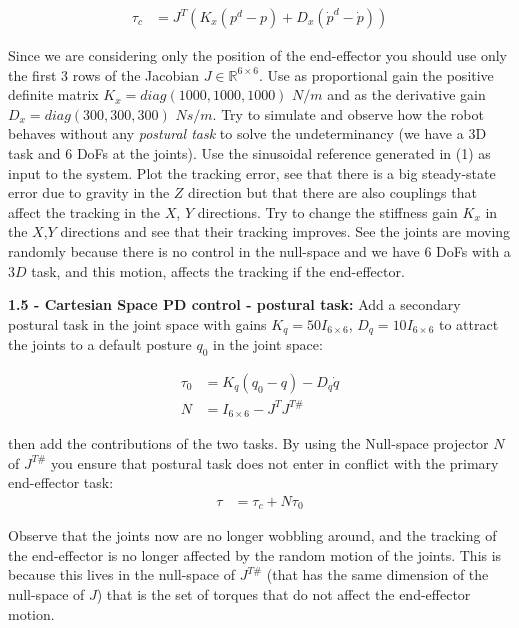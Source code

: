 \documentclass[11pt]{article}
\newcommand{\Rnum}{\mathbb{R}} %
\begin{document}
\begin{align}
\tau_c & = J^T\left(K_x(p^d - p) + D_x(\dot{p}^d -\dot{p})\right)
\end{align}

Since we are considering only the position of the end-effector you should use only the first 3 rows of the Jacobian $J \in \Rnum^{6 \times 6}$. 
Use  as proportional gain the positive definite matrix $K_x = diag(1000, 1000, 1000)$ $N/m$ and as the derivative gain $D_x  = diag(300, 300, 300)$ $Ns/m$. 
Try to simulate and observe how the robot behaves without any \textit{postural task} to solve the undeterminancy (we have a 3D task and 6 DoFs at the joints).
Use the sinusoidal reference generated in (1) as input to the system. Plot the tracking error, see that there is a big steady-state error due to gravity in the $Z$ direction but that there are also couplings that affect  the tracking in the 
$X$, $Y$ directions. Try to change the stiffness gain $K_x$ in the $X$,$Y$ directions and see that their tracking improves. See the joints are moving randomly 
because there is no control in the null-space and we have 6 DoFs with a $3D$ task, and this motion, affects the tracking if the end-effector. 

\quad

\noindent
\textbf{1.5 - Cartesian Space PD control - postural task:}
Add  a secondary postural task in the joint space with  gains $K_q= 50 I_{6 \times6}$,   $D_q = 10I_{6 \times6}$ to attract the joints to a default posture $q_0$ in the joint space:

\begin{align}
\tau_0& = K_q(q_0-q) - D_q\dot{q}\\
N & = I_{6 \times 6} - J^T J^{T\#}
\end{align}

then add the contributions of the two  tasks. By using the Null-space projector $N$ of $J^{T\#}$ you ensure that postural task does not enter in conflict with the primary end-effector task:
\begin{align}
\tau& = \tau_c  + N\tau_0 
\end{align}

Observe that the joints now are no longer wobbling around, and the tracking of the end-effector is no longer affected by the random motion of the joints. 
This is because this lives in the null-space of $J^{T\#}$ (that has the same dimension of the null-space of $J$) that is the set of torques that do not affect the end-effector motion.
\end{document}
